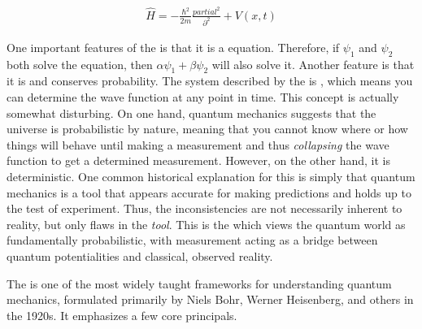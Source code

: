 \begin{align}
\hat{H} = -\frac{\hbar^2}{2m} \frac{partial^2}{\partial^2} + V(x,t)
\end{align}

One important features of the  is that it is a  equation. Therefore, if $\psi_1$ and $\psi_2$ both solve the equation, then $\alpha\psi_1+\beta\psi_2$ will also solve it. Another feature is that it is  and conserves probability. The system described by the  is , which means you can determine the wave function at any point in time. This concept is actually somewhat disturbing. On one hand, quantum mechanics suggests that the universe is probabilistic by nature, meaning that you cannot know where or how things will behave until making a measurement and thus \textit{collapsing} the wave function to get a determined measurement. However, on the other hand, it is deterministic. One common historical explanation for this is simply that quantum mechanics is a tool that appears accurate for making predictions and holds up to the test of experiment. Thus, the inconsistencies are not necessarily inherent to reality, but only flaws in the \textit{tool}. This is the  which views the quantum world as fundamentally probabilistic, with measurement acting as a bridge between quantum potentialities and classical, observed reality.

The  is one of the most widely taught frameworks for understanding quantum mechanics, formulated primarily by Niels Bohr, Werner Heisenberg, and others in the 1920s. It emphasizes a few core principals. 

